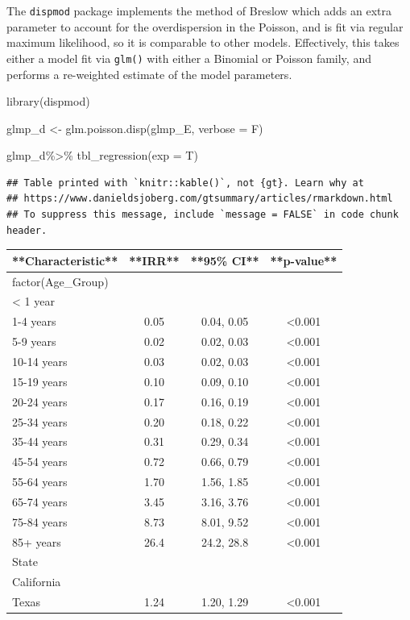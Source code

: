 \documentclass[
]{article}
\newenvironment{Shaded}{\begin{snugshade}}{\end{snugshade}}
\newcommand{\AttributeTok}[1]{\textcolor[rgb]{0.77,0.63,0.00}{#1}}
\newcommand{\FunctionTok}[1]{\textcolor[rgb]{0.00,0.00,0.00}{#1}}
\newcommand{\NormalTok}[1]{#1}
\newcommand{\OtherTok}[1]{\textcolor[rgb]{0.56,0.35,0.01}{#1}}
\newcommand{\SpecialCharTok}[1]{\textcolor[rgb]{0.00,0.00,0.00}{#1}}
\begin{document}
The \texttt{dispmod} package implements the method of Breslow \citeyearpar{breslow_extra-poisson_1984} which adds an extra parameter to account for the overdispersion in the Poisson, and is fit via regular maximum likelihood, so it is comparable to other models. Effectively, this takes either a model fit via \texttt{glm()} with either a Binomial or Poisson family, and performs a re-weighted estimate of the model parameters.

\begin{Shaded}
\begin{Highlighting}[]
\FunctionTok{library}\NormalTok{(dispmod)}

\NormalTok{glmp\_d }\OtherTok{\textless{}{-}} \FunctionTok{glm.poisson.disp}\NormalTok{(glmp\_E,}
                           \AttributeTok{verbose =}\NormalTok{ F)}

\NormalTok{glmp\_d}\SpecialCharTok{\%\textgreater{}\%}
  \FunctionTok{tbl\_regression}\NormalTok{(}\AttributeTok{exp =}\NormalTok{ T)}
\end{Highlighting}
\end{Shaded}

\begin{verbatim}
## Table printed with `knitr::kable()`, not {gt}. Learn why at
## https://www.danieldsjoberg.com/gtsummary/articles/rmarkdown.html
## To suppress this message, include `message = FALSE` in code chunk header.
\end{verbatim}

\begin{tabular}{l|c|c|c}
\hline
**Characteristic** & **IRR** & **95\% CI** & **p-value**\\
\hline
factor(Age\_Group) &  &  & \\
\hline
< 1 year &  &  & \\
\hline
1-4 years & 0.05 & 0.04, 0.05 & <0.001\\
\hline
5-9 years & 0.02 & 0.02, 0.03 & <0.001\\
\hline
10-14 years & 0.03 & 0.02, 0.03 & <0.001\\
\hline
15-19 years & 0.10 & 0.09, 0.10 & <0.001\\
\hline
20-24 years & 0.17 & 0.16, 0.19 & <0.001\\
\hline
25-34 years & 0.20 & 0.18, 0.22 & <0.001\\
\hline
35-44 years & 0.31 & 0.29, 0.34 & <0.001\\
\hline
45-54 years & 0.72 & 0.66, 0.79 & <0.001\\
\hline
55-64 years & 1.70 & 1.56, 1.85 & <0.001\\
\hline
65-74 years & 3.45 & 3.16, 3.76 & <0.001\\
\hline
75-84 years & 8.73 & 8.01, 9.52 & <0.001\\
\hline
85+ years & 26.4 & 24.2, 28.8 & <0.001\\
\hline
State &  &  & \\
\hline
California &  &  & \\
\hline
Texas & 1.24 & 1.20, 1.29 & <0.001\\
\hline
\end{tabular}
\end{document}
